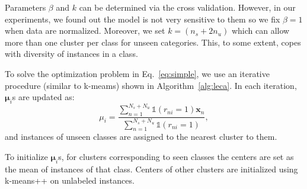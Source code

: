\documentclass[10pt,twocolumn,letterpaper]{article}
\begin{document}
Parameters $\beta$ and $k$ can be determined via the cross validation. However, in our experiments, we found out
the model is not very sensitive to them so we fix $\beta=1$
when data are normalized. Moreover, we set $k =  (n_s + 2n_u)$ which
can allow more than one cluster per class for unseen categories. This, to some extent, copes with diversity of instances in a class.

To solve the optimization problem in Eq.~\ref{eq:simple}, we use an iterative procedure (similar to k-meams) shown in Algorithm~\ref{alg:leca}. In each iteration, $\mathbf{\mu}_i$s are updated as:
\begin{equation} \label{eq:updata_mu}
  \mu_i = \frac{\sum_{n=1}^{N_s + N_u}  \mathds{1}(r_{ni}=1)\mathbf{x}_n}{\sum_{n=1}^{N_s+N_u}\mathds{1}(r_{ni}=1)},
\end{equation}
and instances of unseen classes are assigned to the nearest cluster to them.

To initialize $\boldsymbol{\mu}_i$s, for clusters corresponding to seen classes the centers are set as the mean of instances of that class. Centers of other
clusters are initialized using k-means++ \cite{kmeanspp} on unlabeled instances.



\end{document}

